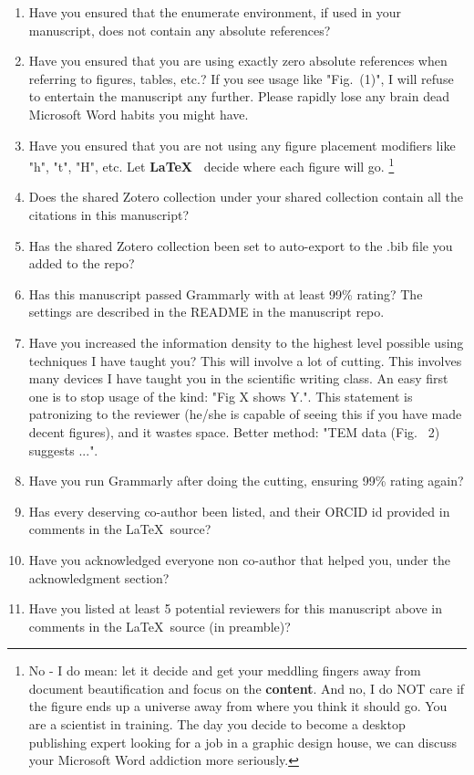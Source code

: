 \documentclass[12 pt]{article}
\begin{document}
{{\begin{enumerate}
    \item Have you ensured that the enumerate environment, if used in your manuscript, does not contain any absolute references?
    \item Have you ensured that you are using exactly zero absolute references when referring to figures, tables, etc.? If you see usage like "Fig.~(1)", I will refuse to entertain the manuscript any further. Please rapidly lose any brain dead Microsoft Word habits you might have.
    \item Have you ensured that you are not using any figure placement modifiers like "h", "t", "H", etc. Let \textbf{\LaTeX\ } decide where each figure will go. \footnote{No - I do mean: let it decide and get your meddling fingers away from document beautification and focus on the \textbf{content}. And no, I do NOT care if the figure ends up a universe away from where you think it should go. You are a scientist in training. The day you decide to become a desktop publishing expert looking for a job in a graphic design house, we can discuss your Microsoft Word addiction more seriously.}
    \item Does the shared Zotero collection under your shared collection contain all the citations in this manuscript?
    \item Has the shared Zotero collection been set to auto-export to the .bib file you added to the repo?
    \item Has this manuscript passed Grammarly with at least 99\% rating? The settings are described in the README in the manuscript repo.
    \item Have you increased the information density to the highest level possible using techniques I have taught you? This will involve a lot of cutting. This involves many devices I have taught you in the scientific writing class. An easy first one is to stop usage of the kind: "Fig X shows Y.". This statement is patronizing to the reviewer (he/she is capable of seeing this if you have made decent figures), and it wastes space. Better method: "TEM data (Fig.~ 2) suggests ...".
    \item Have you run Grammarly after doing the cutting, ensuring 99\% rating again?
    \item Has every deserving co-author been listed, and their ORCID id provided in comments in the \LaTeX\ source?
    \item Have you acknowledged everyone non co-author that helped you, under the acknowledgment section?
    \item Have you listed at least 5 potential reviewers for this manuscript above in comments in the \LaTeX\ source (in preamble)?
    \end{enumerate}
  }%
}
\end{document}
